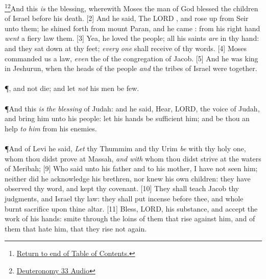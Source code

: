 \footnote{\textcolor[cmyk]{0.99998,1,0,0}{\hyperlink{TOC}{Return to end of Table of Contents.}}}\footnote{\href{https://audiobible.com/bible/deuteronomy_33.html}{\textcolor[cmyk]{0.99998,1,0,0}{Deuteronomy 33 Audio}}}\textcolor[cmyk]{0.99998,1,0,0}{And this \emph{is} the blessing, wherewith Moses the man of God blessed the children of Israel before his death.}
[2] \textcolor[cmyk]{0.99998,1,0,0}{And he said, The LORD , and rose up from Seir unto them; he shined forth from mount Paran, and he came : from his right hand \emph{went} a fiery law  them.}
[3] \textcolor[cmyk]{0.99998,1,0,0}{Yea, he loved the people; all his saints \emph{are} in thy hand: and they sat down at thy feet; \emph{every} \emph{one} shall receive of thy words.}
[4] \textcolor[cmyk]{0.99998,1,0,0}{Moses commanded us a law, \emph{even} the  of the congregation of Jacob.}
[5] \textcolor[cmyk]{0.99998,1,0,0}{And he was king in Jeshurun, when the heads of the people \emph{and} the tribes of Israel were  together.}\\
\\
\P \textcolor[cmyk]{0.99998,1,0,0}{, and not die; and let \emph{not} his men be few.}\\
\\
\P \textcolor[cmyk]{0.99998,1,0,0}{And this \emph{is} \emph{the} \emph{blessing} of Judah: and he said, Hear, LORD, the voice of Judah, and bring him unto his people: let his hands be sufficient  him; and be thou an help \emph{to} \emph{him} from his enemies.}\\
\\
\P \textcolor[cmyk]{0.99998,1,0,0}{And of Levi he said, \emph{Let} thy Thummim and thy Urim \emph{be} with thy holy one, whom thou didst prove at Massah, \emph{and} \emph{with} whom thou didst strive at the waters of Meribah;}
[9] \textcolor[cmyk]{0.99998,1,0,0}{Who said unto his father and to his mother, I have not seen him; neither did he acknowledge his brethren, nor knew his own children:  they have observed thy word, and kept thy covenant.}
[10] \textcolor[cmyk]{0.99998,1,0,0}{They shall teach Jacob thy judgments, and Israel thy law: they shall put incense before thee, and whole burnt sacrifice upon thine altar.}
[11] \textcolor[cmyk]{0.99998,1,0,0}{Bless, LORD, his substance, and accept the work of his hands: smite through the loins of them that rise against him, and of them that hate him, that they rise not again.}\\

